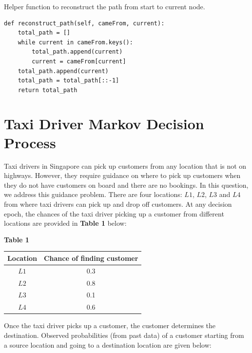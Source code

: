 \documentclass[12pt, letterpaper]{article}
\newcommand{\mybox}[1]{\par\noindent\colorbox{shadecolor}
{\parbox{\dimexpr\textwidth-2\fboxsep\relax}{#1}}}
\begin{document}
Helper function to reconstruct the path from start to current node.

\begin{mdframed}[backgroundcolor=shadecolor]
\begin{verbatim}
def reconstruct_path(self, cameFrom, current):
    total_path = []
    while current in cameFrom.keys():
        total_path.append(current)
        current = cameFrom[current]
    total_path.append(current)
    total_path = total_path[::-1]
    return total_path
\end{verbatim}
\end{mdframed}

\section{Taxi Driver Markov Decision Process}
\mybox{Taxi drivers in Singapore can pick up customers from any location that is not on highways. 
However, they require guidance on where to pick up customers when they do not have customers on board and there are no bookings. 
In this question, we address this guidance problem. 
There are four locations: $L1$, $L2$, $L3$ and $L4$ from where taxi drivers can pick up and drop off customers. 
At any decision epoch, the chances of the taxi driver picking up a customer from different locations are provided in \textbf{Table 1} below:}

\begin{center}
    \textbf{Table 1}

    \begin{tabular}{|c|c|} 
    \hline
    Location & Chance of finding customer\\ 
    \hline
    $L1$ & 0.3 \\
    \hline
    $L2$ & 0.8 \\
    \hline
    $L3$ & 0.1 \\
    \hline
    $L4$ & 0.6 \\
    \hline
    \end{tabular}
    
\end{center}

\mybox{Once the taxi driver picks up a customer, the customer determines the destination. Observed
probabilities (from past data) of a customer starting from a source location and going to a
destination location are given below:}
\end{document}
